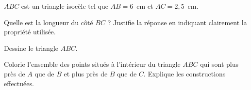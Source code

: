 \begin{myenumerate}
\item $ABC$ est un triangle isocèle tel que $AB=6$~cm et $AC=2,5$~cm.
\par Quelle est la longueur du côté $BC$ ? Justifie la réponse en indiquant clairement la propriété utilisée.\par Dessine le triangle $ABC$.
\item Colorie l'ensemble des points situés à l'intérieur du triangle $ABC$ qui sont plus près de $A$ que de $B$ et plus près de $B$ que de $C$. Explique les constructions effectuées.
\end{myenumerate}
